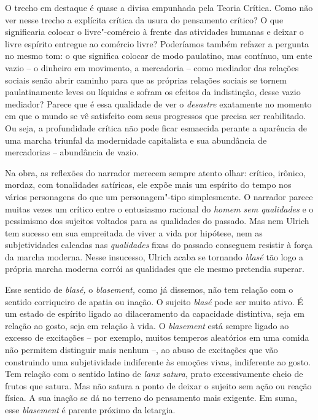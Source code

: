 {O trecho em destaque é quase a divisa empunhada pela Teoria Crítica.
Como não ver nesse trecho a explícita crítica da usura do pensamento
crítico? O que significaria colocar o livre"-comércio à frente das
atividades humanas e deixar o livre espírito entregue ao comércio livre?
Poderíamos também refazer a pergunta no mesmo tom: o que significa
colocar de modo paulatino, mas contínuo, um ente vazio -- o dinheiro em
movimento, a mercadoria -- como mediador das relações sociais senão
abrir caminho para que as próprias relações sociais se tornem
paulatinamente leves ou líquidas e sofram os efeitos da indistinção,
desse vazio mediador? Parece que é essa qualidade de ver o
\emph{desastre} exatamente no momento em que o mundo se vê satisfeito
com seus progressos que precisa ser reabilitado. Ou seja, a profundidade
crítica não pode ficar esmaecida perante a aparência de uma marcha
triunfal da modernidade capitalista e sua abundância de mercadorias --
abundância de vazio.

Na obra, as reflexões do narrador merecem sempre atento olhar: crítico,
irônico, mordaz, com tonalidades satíricas, ele expõe mais um espírito
do tempo nos vários personagens do que um personagem"-tipo simplesmente.
O narrador parece muitas vezes um crítico entre o entusiasmo racional do
\emph{homem sem qualidades} e o pessimismo dos sujeitos voltados para as
qualidades do passado. Mas nem Ulrich tem sucesso em sua empreitada de
viver a vida por hipótese, nem as subjetividades calcadas nas
\emph{qualidades} fixas do passado conseguem resistir à força da marcha
moderna. Nesse insucesso, Ulrich acaba se tornando \emph{blasé} tão logo
a própria marcha moderna corrói as qualidades que ele mesmo pretendia
superar.

Esse sentido de \emph{blasé,} o \emph{blasement,} como já dissemos, não
tem relação com o sentido corriqueiro de apatia ou inação. O sujeito
\emph{blasé} pode ser muito ativo. É um estado de espírito ligado ao
dilaceramento da capacidade distintiva, seja em relação ao gosto, seja
em relação à vida. O \emph{blasement} está sempre ligado ao excesso de
excitações -- por exemplo, muitos temperos aleatórios em uma comida não
permitem distinguir mais nenhum --, ao abuso de excitações que vão
construindo uma subjetividade indiferente às emoções vivas, indiferente
ao gosto. Tem relação com o sentido latino de \emph{lanx satura}, prato
excessivamente cheio de frutos que satura. Mas não satura a ponto de
deixar o sujeito sem ação ou reação física. A sua inação se dá no
terreno do pensamento mais exigente. Em suma, esse \emph{blasement} é
parente próximo da letargia.

}
